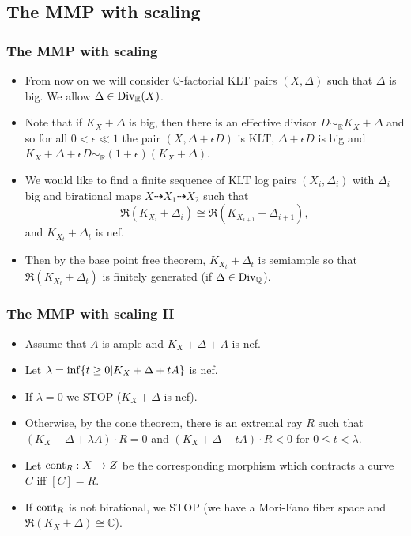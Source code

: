 \documentclass{beamer}
\theoremstyle{plain}
\theoremstyle{definition}
\theoremstyle{remark}
\def\Q{\mathbb {Q}}
\begin{document}
\begin{frame}
\subsection{The MMP with scaling}
\frametitle{The MMP with scaling}
\begin{itemize}\item From now on we will consider 
$\Q$-factorial KLT pairs $(X,\Delta )$ 
such that $\Delta$ is big. We allow $\Delta \in {\rm Div }_{\mathbb {R}}(X)$.
\pause
\item Note that if $K_X+\Delta$ is big, then there is an effective divisor
$D\sim _{\mathbb {R}}K_X+\Delta$ and so for all $0<\epsilon \ll 1$
the pair $(X,\Delta+\epsilon D)$ is KLT, $\Delta+\epsilon D$ is big  
and $K_X+\Delta+\epsilon D\sim _{\mathbb {R}}(1+\epsilon)(K_X+\Delta)$.
\pause
\item We would like to find a finite sequence of KLT 
log pairs $(X_i,\Delta _i)$ with $\Delta _i$ big 
and birational maps
$X\dasharrow X_{1}\dasharrow X_{2}$ such that $$\mathfrak {R}(K_{X_i}+\Delta _i
)\cong \mathfrak {R}(K_{X_{i+1}}+\Delta _{i+1}),$$
and $K_{X_t}+\Delta _t$ is nef.
\pause
\item Then by the base point free theorem, $K_{X_t}+\Delta _t$ is
semiample so that $\mathfrak {R}(K_{X_t}+\Delta _t)$ is finitely generated (if $\Delta \in {\rm Div}_\Q$).
\end{itemize}

\end{frame}
\begin{frame}
 \frametitle{The MMP with scaling II}
\begin{itemize}
\item Assume that $A$ is ample and $K_X+\Delta+A$ is nef. 
\pause
\item Let $\lambda ={\rm inf}\{t\geq 0|K_X+\Delta +tA\}$ is nef.
\pause
\item If $\lambda =0$ we STOP ($K_X+\Delta$ is nef). 
\pause
\item Otherwise, by the cone theorem,
there is an extremal ray $R$ such that $(K_X+\Delta +\lambda A)\cdot R=0$ and $(K_X+\Delta +tA)\cdot R<0$
for $0\leq t<\lambda$.
\pause
\item Let ${\rm cont}_R:X\to Z$ be the corresponding morphism which contracts 
a curve $C$ iff $[C]=R$.
\pause
\item If ${\rm cont}_R$ is not birational, we STOP (we
have a Mori-Fano fiber space and $\mathfrak {R}(K_X+\Delta)\cong \mathbb{C}$).
\end{itemize}
\end{frame}
\end{document}
